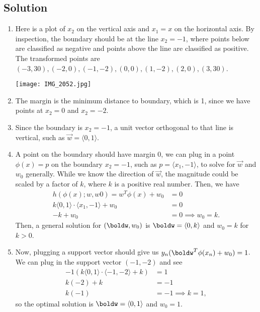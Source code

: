 \documentclass[submit]{harvardml}
\begin{document}
\subsection*{Solution}

\begin{enumerate}
    \item Here is a plot of $x_2$ on the vertical axis and $x_1 = x$ on the horizontal axis. By inspection, the boundary should be at the line $x_2 = -1$, where points below are classified as negative and points above the line are classified as positive. The transformed points are $(-3,30),(-2,0),(-1,-2),(0,0),(1,-2),(2,0),(3,30)$.
    
    \texttt{[image: IMG\_2052.jpg]}
    
    \item The margin is the minimum distance to boundary, which is 1, since we have points at $x_2 = 0$ and $x_2 = -2$.
    
    \item Since the boundary is $x_2 = -1$, a unit vector orthogonal to that line is vertical, such as $\vec{w} = \langle 0,1 \rangle$.
    \item A point on the boundary should have margin 0, we can plug in a point $\phi(x) = p$ on the boundary $x_2 = -1$, such as $p = \langle x_1, -1 \rangle$, to solve for $\vec{w}$ and $w_0$ generally. While we know the direction of $\vec{w}$, the magnitude could be scaled by a factor of $k$, where $k$ is a positive real number. Then, we have
    \begin{align*}
        h( \phi(x) ; w, w0) = w^T \phi(x) + w_0 &= 0 \\
        k \langle 0,1 \rangle \cdot \langle x_1, -1 \rangle + w_0 &= 0 \\
        -k + w_0 &= 0 \implies w_0 = k.
    \end{align*}
    Then, a general solution for $(\boldw, w_0)$ is $\boldw = \langle 0, k \rangle$ and $w_0 = k$ for $k > 0$.
    \item Now, plugging a support vector should give us $y_n(\boldw^T \phi(x_n) + w_0) = 1$. We can plug in the support vector $(-1,-2)$ and see
    \begin{align*}
        -1(k \langle 0,1 \rangle \cdot \langle -1,-2 \rangle + k) &= 1 \\
        k(-2) + k &= -1 \\
        k(-1) &= - 1 \implies k = 1,
    \end{align*}
    so the optimal solution is $\boldw = \langle 0, 1 \rangle$ and $w_0 = 1$.
    

\end{enumerate}
\end{document}
